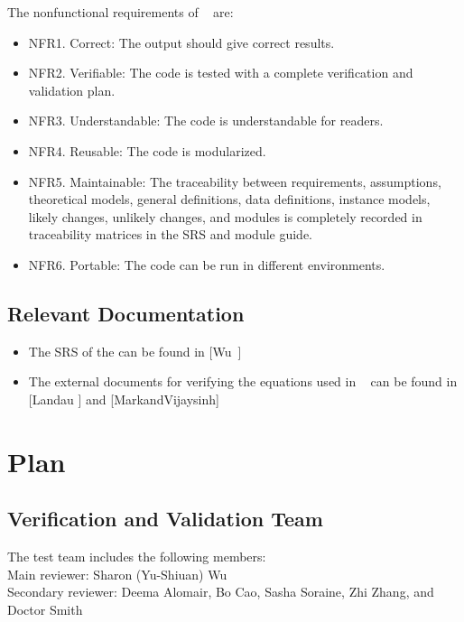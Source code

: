 \documentclass[12pt, titlepage]{article}
\begin{document}
The nonfunctional requirements  of  \progname~ are: 
\begin{itemize} 
\item[ ]NFR1. Correct: The output should give correct results.
\item[ ]NFR2. Verifiable: The code is tested with a complete verification and validation 
plan.
\item[ ]NFR3. Understandable: The code is understandable for readers. 
\item[ ]NFR4. Reusable: The code is modularized.
\item[ ]NFR5. Maintainable: The traceability between requirements, assumptions,
theoretical models, general definitions, data definitions, instance models,
likely changes, unlikely changes, and modules is completely recorded in
traceability matrices in the SRS and module guide.
\item[ ]NFR6. Portable: The code can be run in different environments.
\end{itemize}


\subsection{Relevant Documentation}\label{RD}

\begin{itemize} 
\item[ ]The SRS of the \progname can be found in [Wu~\cite{YS2019}] 
\item[ ]The external documents for verifying the equations used in \progname~
can be found in [Landau ] \cite{Charles2001} and
[MarkandVijaysinh] \cite{JacobsonandJadhav} 

 \end{itemize} 

 \section{Plan}	
\subsection{Verification and Validation Team} The test team includes the
following members:\\ 
Main reviewer: Sharon (Yu-Shiuan) Wu\\ 
Secondary reviewer: Deema Alomair, Bo Cao, Sasha Soraine, Zhi Zhang, 
and Doctor Smith\\
\end{document}
